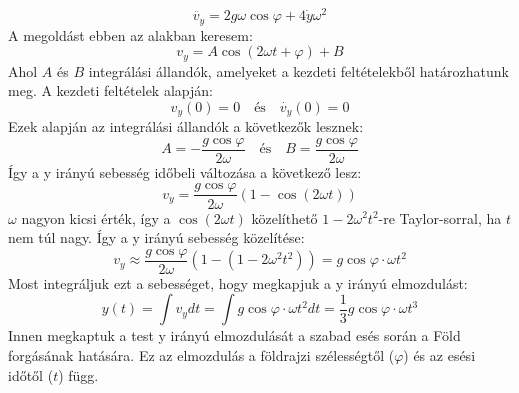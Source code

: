 \documentclass[a4paper,12pt]{article}
\begin{document}
\begin{equation}
    \ddot{v_y} = 2g\omega\cos\varphi + 4\dot{y}\omega^2
\end{equation}
A megoldást ebben az alakban keresem:
\begin{equation}
    v_y = A\cos(2\omega t + \varphi) + B
\end{equation}
Ahol $A$ és $B$ integrálási állandók, amelyeket a kezdeti feltételekből határozhatunk meg. A kezdeti feltételek alapján:
\begin{equation}
    v_y(0) = 0 \quad \text{és} \quad \dot{v_y}(0) = 0
\end{equation}
Ezek alapján az integrálási állandók a következők lesznek:
\begin{equation}
    A = -\frac{g\cos\varphi}{2\omega} \quad \text{és} \quad B = \frac{g\cos\varphi}{2\omega}
\end{equation}
Így a y irányú sebesség időbeli változása a következő lesz:
\begin{equation}
    v_y = \frac{g\cos\varphi}{2\omega}(1 - \cos(2\omega t))
\end{equation}
$\omega$ nagyon kicsi érték, így a $\cos(2\omega t)$ közelíthető $1 - 2\omega^2 t^2$-re Taylor-sorral, ha $t$ nem túl nagy. Így a y irányú sebesség közelítése:
\begin{equation}
    v_y \approx \frac{g\cos\varphi}{2\omega}(1 - (1 - 2\omega^2 t^2)) = g\cos\varphi \cdot \omega t^2
\end{equation}
Most integráljuk ezt a sebességet, hogy megkapjuk a y irányú elmozdulást:
\begin{equation}
    y(t) = \int v_y dt = \int g\cos\varphi \cdot \omega t^2 dt = \frac{1}{3}g\cos\varphi \cdot \omega t^3
\end{equation}
Innen megkaptuk a test y irányú elmozdulását a szabad esés során a Föld forgásának hatására. Ez az elmozdulás a földrajzi szélességtől ($\varphi$) és az esési időtől ($t$) függ.
\end{document}
